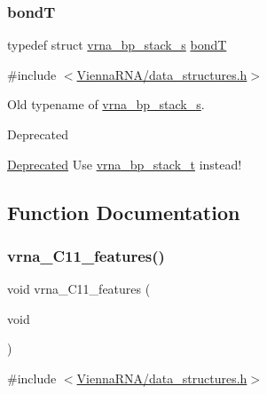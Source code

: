 \subsubsection{\texorpdfstring{bondT}{bondT}}
{\footnotesize\ttfamily typedef struct \hyperlink{group__data__structures_structvrna__bp__stack__s}{vrna\+\_\+bp\+\_\+stack\+\_\+s} \hyperlink{group__data__structures_gaaeed53a7508c6ce549a98223e94b25df}{bondT}}



{\ttfamily \#include $<$\hyperlink{data__structures_8h}{Vienna\+R\+N\+A/data\+\_\+structures.\+h}$>$}



Old typename of \hyperlink{group__data__structures_structvrna__bp__stack__s}{vrna\+\_\+bp\+\_\+stack\+\_\+s}. 

\begin{DoxyRefDesc}{Deprecated}
\item[\hyperlink{deprecated__deprecated000051}{Deprecated}]Use \hyperlink{group__data__structures_gaa651bda42e7692f08cb603cd6834b0ee}{vrna\+\_\+bp\+\_\+stack\+\_\+t} instead! \end{DoxyRefDesc}


\subsection{Function Documentation}
\mbox{\label{group__data__structures_ga21744ae2d6a17309f9327d3547cef0cb}} 
\subsubsection{\texorpdfstring{vrna\+\_\+\+C11\+\_\+features()}{vrna\_C11\_features()}}
{\footnotesize\ttfamily void vrna\+\_\+\+C11\+\_\+features (\begin{DoxyParamCaption}\item[{void}]{ }\end{DoxyParamCaption})}



{\ttfamily \#include $<$\hyperlink{data__structures_8h}{Vienna\+R\+N\+A/data\+\_\+structures.\+h}$>$}



